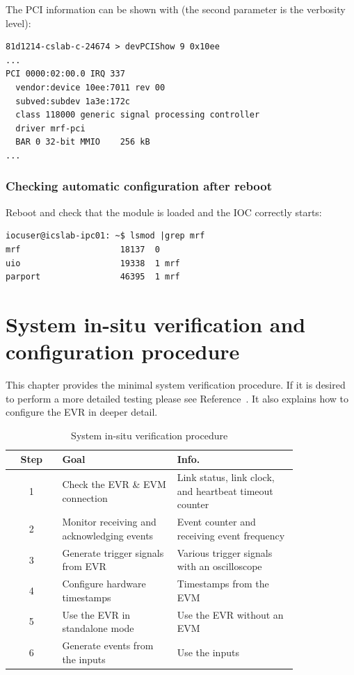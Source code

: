 \documentclass[11pt
  , a4paper
  , article
  , oneside
  , showtrims
]{memoir}
\begin{document}
{The PCI information can be shown with (the second parameter is the verbosity level):
\begin{lstlisting}
81d1214-cslab-c-24674 > devPCIShow 9 0x10ee
...
PCI 0000:02:00.0 IRQ 337
  vendor:device 10ee:7011 rev 00
  subved:subdev 1a3e:172c
  class 118000 generic signal processing controller
  driver mrf-pci
  BAR 0 32-bit MMIO    256 kB
...
\end{lstlisting}

\subsection{Checking automatic configuration after reboot}
Reboot and check that the module is loaded and the IOC correctly starts:
\begin{lstlisting}[style=termstyle]
iocuser@icslab-ipc01: ~$ lsmod |grep mrf
mrf                    18137  0
uio                    19338  1 mrf
parport                46395  1 mrf
\end{lstlisting}



\chapter{System in-situ verification and configuration procedure}
This chapter provides the minimal system verification procedure. If it is desired to perform a more detailed testing please see Reference~\citep[see][p14]{EVR-USER-GUIDE}. It also explains how to configure the EVR in deeper detail.

\begin{table}[!htb]
  \centering
  \begin{tabular}{c|p{0.4\linewidth}|p{0.42\linewidth}}
    \toprule
    Step & Goal                                       & Info.                                                  \\\midrule
    1    & Check the EVR \& EVM connection            & Link status, link clock, and heartbeat timeout counter \\\midrule
    2    & Monitor receiving and acknowledging events & Event counter and receiving event frequency            \\\midrule
    3    & Generate trigger signals from EVR          & Various trigger signals with an oscilloscope           \\\midrule
    4    & Configure hardware timestamps              & Timestamps from the EVM                                \\\midrule
    5    & Use the EVR in standalone mode             & Use the EVR without an EVM                             \\\midrule
    6    & Generate events from the inputs            & Use the inputs                                         \\\bottomrule
  \end{tabular}
  \caption[]{System in-situ verification procedure}
  \label{table:checklist}
\end{table}


}
\end{document}
